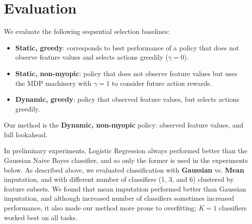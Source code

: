 \section{Evaluation}
We evaluate the following sequential selection baselines:
\begin{itemize}\addtolength{\itemsep}{-.35\baselineskip}
\item \textbf{Static, greedy}: corresponds to best performance of a policy that does not observe feature values and selects actions greedily ($\gamma=0$).
\item \textbf{Static, non-myopic}: policy that does not observe feature values but uses the MDP machinery with $\gamma=1$ to consider future action rewards.
\item \textbf{Dynamic, greedy}: policy that observed feature values, but selects actions greedily.
\end{itemize}
Our method is the \textbf{Dynamic, non-myopic} policy: observed feature values, and full lookahead.


In preliminary experiments, Logistic Regression always performed better than the Gaussian Naive Bayes classifier, and so only the former is used in the experiments below.
As described above, we evaluated classification with \textbf{Gaussian} vs. \textbf{Mean} imputation, and with different number of classifiers (1, 3, and 6) clustered by feature subsets.
We found that mean imputation performed better than Gaussian imputation, and although increased number of classifiers sometimes increased performance, it also made our method more prone to overfitting; $K=1$ classifiers worked best on all tasks.

